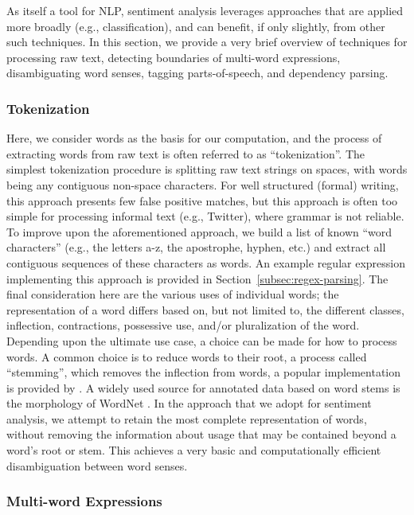 As itself a tool for NLP,
sentiment analysis leverages approaches that are applied more broadly (e.g., classification),
and can benefit,
if only slightly,
from other such techniques.
In this section, we provide a very brief overview of techniques
for processing raw text,
detecting boundaries of multi-word expressions,
disambiguating word senses,
tagging parts-of-speech,
and dependency parsing.

\subsubsection{Tokenization}

Here,
we consider words as the basis for our computation,
and the process of extracting words from raw text is often referred to as ``tokenization''.
The simplest tokenization procedure is splitting raw text strings on spaces,
with words being any contiguous non-space characters.
For well structured (formal) writing,
this approach presents few false positive matches,
but this approach is often too simple for processing informal text
(e.g., Twitter),
where grammar is not reliable.
To improve upon the aforementioned approach,
we build a list of known ``word characters'' (e.g., the letters a-z, the apostrophe, hyphen, etc.) and extract all contiguous sequences of these characters as words.
An example regular expression implementing this approach is provided in Section~\ref{subsec:regex-parsing}.
The final consideration here are the various uses of individual words;
the representation of a word differs based on,
but not limited to,
the different classes,
inflection,
contractions,
possessive use,
and/or pluralization of the word.
Depending upon the ultimate use case,
a choice can be made for how to process words.
A common choice is to reduce words to their root,
a process called ``stemming'',
which removes the inflection from words,
a popular implementation is provided by \cite{porter2001snowball}.
A widely used source for annotated data based on word stems is the morphology of WordNet \citep{fellbaum1998a}.
In the approach that we adopt for sentiment analysis,
we attempt to retain the most complete representation of words,
without removing the information about usage that may be contained beyond a word's root or stem.
This achieves a very basic
and computationally efficient disambiguation between word senses.

\subsubsection{Multi-word Expressions}
\label{subsec:mwe}

